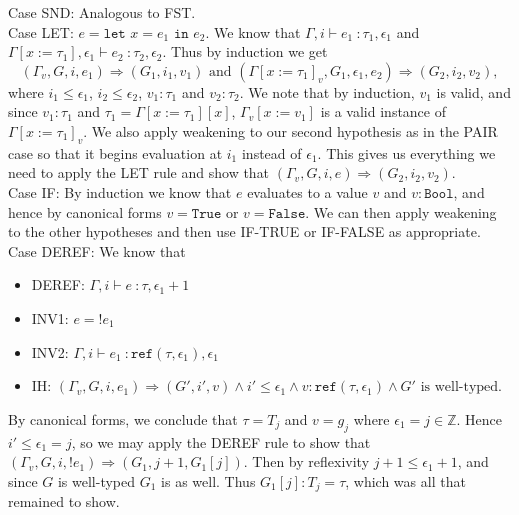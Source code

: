 \documentclass{article}
\newcommand{\Z}{\mathbb{Z}}
\newcommand{\oktype}{valid}
\begin{document}
Case SND: Analogous to FST.
\\

Case LET: $e = \texttt{let } x = e_1 \texttt{ in } e_2$. We know that $\Gamma, i \vdash e_1\ \colon \tau_1, \epsilon_1$ and $\Gamma[x := \tau_1], \epsilon_1 \vdash e_2\ \colon \tau_2, \epsilon_2$. Thus by induction we get
$$(\Gamma_v, G, i, e_1) \Rightarrow (G_1, i_1, v_1)\mbox{ and }(\Gamma[x := \tau_1]_v, G_1, \epsilon_1, e_2) \Rightarrow (G_2, i_2, v_2),$$
where $i_1 \leq \epsilon_1$, $i_2 \leq \epsilon_2$, $v_1 : \tau_1$ and $v_2 : \tau_2$. We note that by induction, $v_1$ is \oktype, and since $v_1 : \tau_1$ and $\tau_1 = \Gamma[x := \tau_1][x]$, $\Gamma_v[x := v_1]$ is a valid instance of $\Gamma[x := \tau_1]_v$. We also apply weakening to our second hypothesis as in the PAIR case so that it begins evaluation at $i_1$ instead of $\epsilon_1$. This gives us everything we need to apply the LET rule and show that $(\Gamma_v, G, i, e) \Rightarrow (G_2, i_2, v_2)$.
\\

Case IF: By induction we know that $e$ evaluates to a value $v$ and $v : \texttt{Bool}$, and hence by canonical forms $v = \texttt{True}$ or $v = \texttt{False}$. We can then apply weakening to the other hypotheses and then use IF-TRUE or IF-FALSE as appropriate.
\\

Case DEREF: We know that
\begin{itemize}
	\item DEREF: $\Gamma, i \vdash e\ \colon \tau, \epsilon_1+1$
	\item INV1: $e = !e_1$
	\item INV2: $\Gamma, i \vdash e_1\ \colon \texttt{ref}(\tau, \epsilon_1), \epsilon_1$
	\item IH: $(\Gamma_v, G, i, e_1) \Rightarrow (G', i', v) \wedge i' \leq \epsilon_1 \wedge v : \texttt{ref}(\tau, \epsilon_1) \wedge G' \mbox{ is well-typed}$.
\end{itemize}

By canonical forms, we conclude that $\tau = T_j$ and $v = g_j$ where $\epsilon_1 = j \in \Z$. Hence $i' \leq \epsilon_1 = j$, so we may apply the DEREF rule to show that $(\Gamma_v, G, i, !e_1) \Rightarrow (G_1, j+1, G_1[j])$. Then by reflexivity $j + 1 \leq \epsilon_1 + 1$, and since $G$ is well-typed $G_1$ is as well. Thus $G_1[j] : T_j = \tau$, which was all that remained to show.
\\
\end{document}

